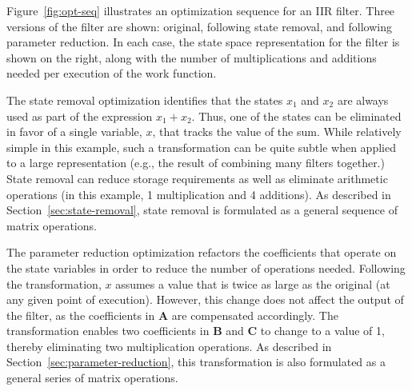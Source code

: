 Figure~\ref{fig:opt-seq} illustrates an optimization sequence for an
IIR filter.  Three versions of the filter are shown: original,
following state removal, and following parameter reduction.  In each
case, the state space representation for the filter is shown on the
right, along with the number of multiplications and additions needed
per execution of the work function.

The state removal optimization identifies that the states $x_1$ and
$x_2$ are always used as part of the expression $x_1 + x_2$.  Thus,
one of the states can be eliminated in favor of a single variable,
$x$, that tracks the value of the sum.  While relatively simple in
this example, such a transformation can be quite subtle when applied
to a large representation (e.g., the result of combining many filters
together.)  State removal can reduce storage requirements as well as
eliminate arithmetic operations (in this example, 1 multiplication and
4 additions).  As described in Section~\ref{sec:state-removal}, state
removal is formulated as a general sequence of matrix operations.

The parameter reduction optimization refactors the coefficients that
operate on the state variables in order to reduce the number of
operations needed.  Following the transformation, $x$ assumes a value
that is twice as large as the original (at any given point of
execution).  However, this change does not affect the output of the
filter, as the coefficients in $\mathbf{A}$ are compensated
accordingly.  The transformation enables two coefficients in
$\mathbf{B}$ and $\mathbf{C}$ to change to a value of 1, thereby
eliminating two multiplication operations.  As described in
Section~\ref{sec:parameter-reduction}, this transformation is also
formulated as a general series of matrix operations.
